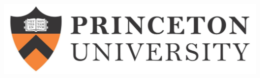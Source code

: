 \documentclass[final]{beamer}
\newlength{\onecolwid}
\begin{document}
\begin{frame}[t]
\begin{columns}[t]
\begin{column}{\onecolwid}
\begin{center}
\includegraphics[width=0.5\linewidth]{PU-long.jpg}
\end{center}


\end{column} %

\end{columns} %

\end{frame} %
\end{document}
